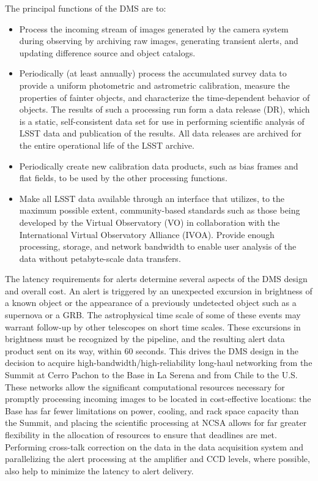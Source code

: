 \documentclass[DM,lsstdraft,toc]{lsstdoc}
\begin{document}
The principal functions of the DMS are to: 
\begin{itemize}
	\item Process the incoming stream of images generated by the camera system during observing by archiving raw images, generating transient alerts, and updating difference source and object catalogs.
	\item Periodically (at least annually) process the accumulated survey data to provide a uniform photometric and astrometric calibration, measure the properties of fainter objects, and characterize the time-dependent behavior of objects. The results of such a processing run form a data release (DR), which is a static, self-consistent data set for use in performing scientific analysis of LSST data and publication of the results. All data releases are archived for the entire operational life of the LSST archive.
	\item Periodically create new calibration data products, such as bias frames and flat fields, to be used by the other processing functions. 
	\item Make all LSST data available through an interface that utilizes, to the maximum possible extent, community-based standards such as those being developed by the Virtual Observatory (VO) in collaboration with the International Virtual Observatory Alliance (IVOA).  Provide enough processing, storage, and network bandwidth to enable user analysis of the data without petabyte-scale data transfers. 
\end{itemize}

The latency requirements for alerts determine several aspects of the DMS design
and overall cost.  An alert is triggered by an unexpected excursion in
brightness of a known object or the appearance of a previously undetected
object such as a supernova or a GRB. The astrophysical time scale of some of
these events may warrant follow-up by other telescopes on short time scales.
These excursions in brightness must be recognized by the pipeline, and the
resulting alert data product sent on its way, within 60 seconds. This drives
the DMS design in the decision to acquire high-bandwidth/high-reliability
long-haul networking from the Summit at Cerro Pachon to the Base in La Serena and from Chile to the U.S. These networks allow the significant computational
resources necessary for promptly processing incoming images to be located in
cost-effective locations: the Base has far fewer limitations on power, cooling,
and rack space capacity than the Summit, and placing the scientific
processing at NCSA allows for far greater flexibility in the allocation of
resources to ensure that deadlines are met. Performing cross-talk correction
on the data in the data acquisition system and parallelizing the alert
processing at the amplifier and CCD levels, where possible, also help to
minimize the latency to alert delivery.
\end{document}
